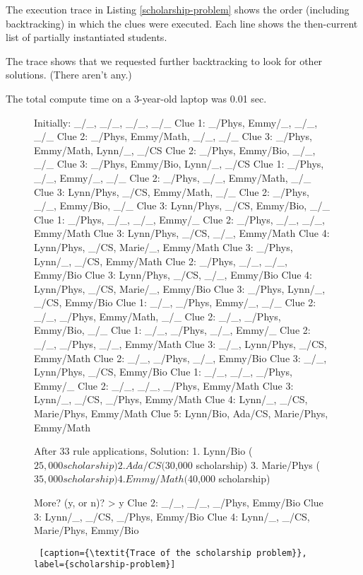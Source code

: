 The execution trace in Listing \ref{scholarship-problem} shows the order (including backtracking) in which the clues were executed. Each line shows the then-current list of partially instantiated students. 

The trace shows that we requested further backtracking to look for other solutions. (There aren't any.) 

The total compute time on a 3-year-old laptop was 0.01 sec. 


\begin{figure}[hb]
    \flushright
\begin{minipage}[c]{0.45\textwidth}
\begin{python1}
Initially: _/_, _/_, _/_, _/_
Clue 1: _/Phys, Emmy/_, _/_, _/_
Clue 2: _/Phys, Emmy/Math, _/_, _/_
Clue 3: _/Phys, Emmy/Math, Lynn/_, _/CS
Clue 2: _/Phys, Emmy/Bio, _/_, _/_
Clue 3: _/Phys, Emmy/Bio, Lynn/_, _/CS
Clue 1: _/Phys, _/_, Emmy/_, _/_
Clue 2: _/Phys, _/_, Emmy/Math, _/_
Clue 3: Lynn/Phys, _/CS, Emmy/Math, _/_
Clue 2: _/Phys, _/_, Emmy/Bio, _/_
Clue 3: Lynn/Phys, _/CS, Emmy/Bio, _/_
Clue 1: _/Phys, _/_, _/_, Emmy/_
Clue 2: _/Phys, _/_, _/_, Emmy/Math
Clue 3: Lynn/Phys, _/CS, _/_, Emmy/Math
Clue 4: Lynn/Phys, _/CS, Marie/_, Emmy/Math
Clue 3: _/Phys, Lynn/_, _/CS, Emmy/Math
Clue 2: _/Phys, _/_, _/_, Emmy/Bio
Clue 3: Lynn/Phys, _/CS, _/_, Emmy/Bio
Clue 4: Lynn/Phys, _/CS, Marie/_, Emmy/Bio
Clue 3: _/Phys, Lynn/_, _/CS, Emmy/Bio
Clue 1: _/_, _/Phys, Emmy/_, _/_
Clue 2: _/_, _/Phys, Emmy/Math, _/_
Clue 2: _/_, _/Phys, Emmy/Bio, _/_
Clue 1: _/_, _/Phys, _/_, Emmy/_
Clue 2: _/_, _/Phys, _/_, Emmy/Math
Clue 3: _/_, Lynn/Phys, _/CS, Emmy/Math
Clue 2: _/_, _/Phys, _/_, Emmy/Bio
Clue 3: _/_, Lynn/Phys, _/CS, Emmy/Bio
Clue 1: _/_, _/_, _/Phys, Emmy/_
Clue 2: _/_, _/_, _/Phys, Emmy/Math
Clue 3: Lynn/_, _/CS, _/Phys, Emmy/Math
Clue 4: Lynn/_, _/CS, Marie/Phys, Emmy/Math
Clue 5: Lynn/Bio, Ada/CS, Marie/Phys, Emmy/Math

After 33 rule applications,
Solution: 
	1. Lynn/Bio	($25,000 scholarship)
	2. Ada/CS	($30,000 scholarship)
	3. Marie/Phys	($35,000 scholarship)
	4. Emmy/Math	($40,000 scholarship)

More? (y, or n)? > y
Clue 2: _/_, _/_, _/Phys, Emmy/Bio
Clue 3: Lynn/_, _/CS, _/Phys, Emmy/Bio
Clue 4: Lynn/_, _/CS, Marie/Phys, Emmy/Bio
\end{python1}\linv
\begin{lstlisting} [caption={\textit{Trace of the scholarship problem}}, label={scholarship-problem}]
\end{lstlisting}
\end{minipage} \linv
\end{figure}

